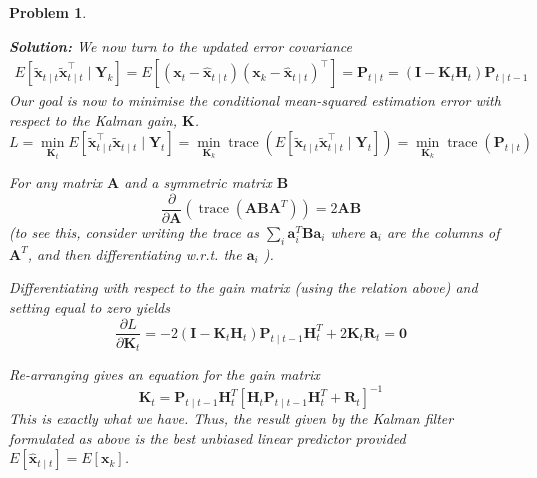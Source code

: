 \documentclass[11pt]{article}
\theoremstyle{plain} %
\newtheorem{problem}[theorem]{Problem}
\newenvironment{solution}
{\color{C2}\normalfont\begin{framed}\begingroup\textbf{Solution:} }
  {\endgroup\end{framed}}
\theoremstyle{remark}
\begin{document}
\begin{problem}
\begin{enumerate}[label=(\alph*)]
\begin{solution}
          We now turn to the updated error covariance
          \begin{align*}
              E\left[\widetilde{\mathbf{x}}_{t \mid t} \widetilde{\mathbf{x}}_{t \mid t}^\top \mid \mathbf{Y}_k\right]                                                                                                           
              =E\left[\left(\mathbf{x}_{t}-\hat{\mathbf{x}}_{t \mid t}\right)\left(\mathbf{x}_{k}-\hat{\mathbf{x}}_{t \mid t}\right)^\top\right]                                                                                    
              =\mathbf{P}_{t \mid t} =\left(\mathbf{I}-\mathbf{K}_{t} \mathbf{H}_{t}\right) \mathbf{P}_{t \mid t-1}
          \end{align*}
          Our goal is now to minimise the conditional mean-squared estimation
          error with respect to the Kalman gain, $\mathbf{K}$.
          $$
              L =\min _{\mathbf{K}_{t}} E\left[\widetilde{\mathbf{x}}_{t \mid t}^\top \widetilde{\mathbf{x}}_{t \mid t} \mid \mathbf{Y}_{t}\right]                                  
                =\min _{\mathbf{K}_{k}} \operatorname{trace}\left(E\left[\widetilde{\mathbf{x}}_{t \mid t} \widetilde{\mathbf{x}}_{t \mid t}^\top \mid \mathbf{Y}_{t}\right]\right) 
                =\min _{\mathbf{K}_{k}} \operatorname{trace}\left(\mathbf{P}_{t \mid t}\right)
          $$

          For any matrix $\mathbf{A}$ and a symmetric matrix $\mathbf{B}$
          $$
            \frac{\partial}{\partial \mathbf{A}}\left(\operatorname{trace}\left(\mathbf{A B A}^T\right)\right)=2 \mathbf{A B}
          $$
          (to see this, consider writing the trace as $\sum_i \mathbf{a}_i^T
          \mathbf{B} \mathbf{a}_i$ where $\mathbf{a}_i$ are the columns of
          $\mathbf{A}^T$, and then differentiating w.r.t. the $\mathbf{a}_i$ ).

          Differentiating with respect to
          the gain matrix (using the relation above) and setting equal to zero
          yields
          $$
            \frac{\partial L}{\partial \mathbf{K}_{t}}=-2\left(\mathbf{I}-\mathbf{K}_{t} \mathbf{H}_{t}\right) \mathbf{P}_{t \mid t-1} \mathbf{H}_{t}^T+2 \mathbf{K}_{t} \mathbf{R}_{t}=\mathbf{0}
          $$

          Re-arranging gives an equation for the gain matrix
          $$
            \mathbf{K}_{t}=\mathbf{P}_{t \mid t-1} \mathbf{H}_{t}^T\left[\mathbf{H}_{t} \mathbf{P}_{t \mid t-1} \mathbf{H}_{t}^T+\mathbf{R}_{t}\right]^{-1}
          $$
          This is exactly what we have. Thus, the result given by the Kalman filter formulated as above is the best unbiased linear predictor provided
          $E\left[\hat{\mathbf{x}}_{t \mid t}\right]=E\left[\mathbf{x}_{k}\right]$.


\end{solution}
\end{enumerate}
\end{problem}
\end{document}
